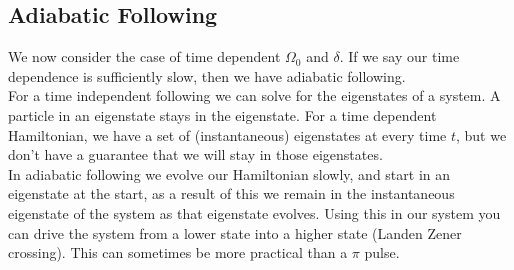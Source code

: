 \subsection{Adiabatic Following}
We now consider the case of time dependent $\Omega_0$ and $\delta$. If we say our time dependence is sufficiently slow, then we have adiabatic following. \\
For a time independent following we can solve for the eigenstates of a system. A particle in an eigenstate stays in the eigenstate. For a time dependent Hamiltonian, we have a set of (instantaneous) eigenstates at every time $t$, but we don't have a guarantee that we will stay in those eigenstates. \\
In adiabatic following we evolve our Hamiltonian slowly, and start in an eigenstate at the start, as a result of this we remain in the instantaneous eigenstate of the system as that eigenstate evolves. Using this in our system you can drive the system from a lower state into a higher state (Landen Zener crossing). This can sometimes be more practical than a $\pi$ pulse.
